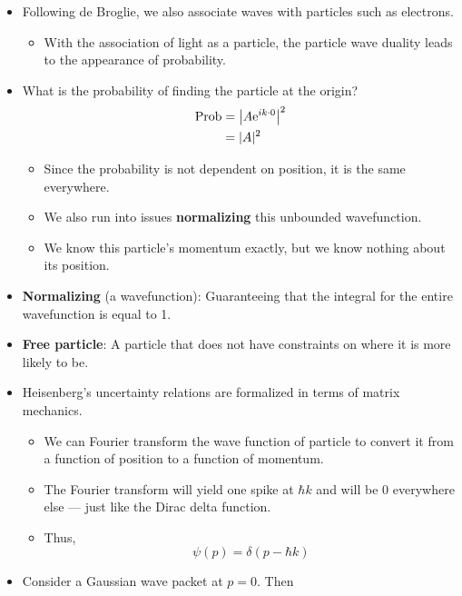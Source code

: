 \documentclass[../notes.tex]{subfiles}
\begin{document}
\begin{itemize}
    \item Following de Broglie, we also associate waves with particles such as electrons.
    \begin{itemize}
        \item With the association of light as a particle, the particle wave duality leads to the appearance of probability.
    \end{itemize}
    \item What is the probability of finding the particle at the origin?
    \begin{align*}
        \Prob &= \left| A\e[ik\cdot 0] \right|^2\\
        &= |A|^2\\
    \end{align*}
    \begin{itemize}
        \item Since the probability is not dependent on position, it is the same everywhere.
        \item We also run into issues \textbf{normalizing} this unbounded wavefunction.
        \item We know this particle's momentum exactly, but we know nothing about its position.
    \end{itemize}
    \item \textbf{Normalizing} (a wavefunction): Guaranteeing that the integral for the entire wavefunction is equal to 1.
    \item \textbf{Free particle}: A particle that does not have constraints on where it is more likely to be.
    \item Heisenberg's uncertainty relations are formalized in terms of matrix mechanics.
    \begin{itemize}
        \item We can Fourier transform the wave function of particle to convert it from a function of position to a function of momentum.
        \item The Fourier transform will yield one spike at $\hbar k$ and will be 0 everywhere else --- just like the Dirac delta function.
        \item Thus,
        \begin{equation*}
            \psi(p) = \delta(p-\hbar k)
        \end{equation*}
    \end{itemize}
    \item Consider a Gaussian wave packet at $p=0$. Then
    \begin{equation*}

\end{equation*}
\end{itemize}
\end{document}
